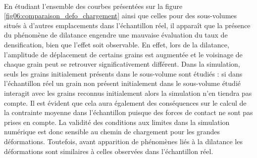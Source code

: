		\\En étudiant l'ensemble des courbes présentées sur la figure \ref{fig06:comparaison_defo_chargement} ainsi que celles pour des sous-volumes situés à d'autres emplacements dans l'échantillon réel, il apparaît que la présence du phénomène de dilatance engendre une mauvaise évaluation du taux de densification, bien que l'effet soit observable. En effet, lors de la dilatance, l'amplitude de déplacement de certains grains est augmentée et le voisinage de chaque grain peut se retrouver significativement différent. Dans la simulation, seuls les grains initialement présents dans le sous-volume sont étudiés : si dans l'échantillon réel un grain non présent initialement dans le sous-volume étudié interagit avec les grains reconnus initialement alors la simulation n'en tiendra pas compte. Il est évident que cela aura également des conséquences sur le calcul de la contrainte moyenne dans l'échantillon puisque des forces de contact ne sont pas prises en compte. La validité des conditions aux limites dans la simulation numérique est donc sensible au chemin de chargement pour les grandes déformations. Toutefois, avant apparition de phénomènes liés à la dilatance les déformations sont similaires à celles observées dans l'échantillon réel.
